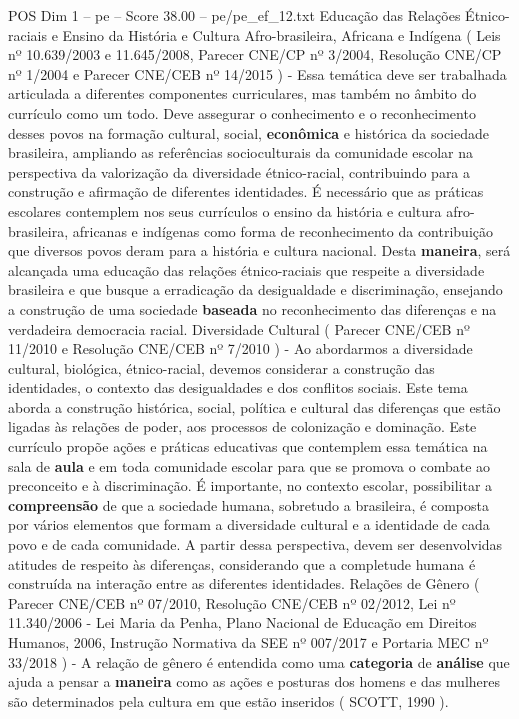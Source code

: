 \begin{textsample}{POS Dim 1 – pe – Score 38.00 – pe/pe\_ef\_12.txt}
Educação das Relações Étnico-raciais e Ensino da História e Cultura Afro-brasileira, Africana e Indígena ( Leis nº 10.639/2003 e 11.645/2008, Parecer CNE/CP nº 3/2004, Resolução CNE/CP nº 1/2004 e Parecer CNE/CEB nº 14/2015 ) - Essa temática deve ser trabalhada articulada a diferentes componentes curriculares, mas também no âmbito do currículo como um todo.
Deve assegurar o conhecimento e o reconhecimento desses povos na formação cultural, social, \textbf{econômica} e histórica da sociedade brasileira, ampliando as referências socioculturais da comunidade escolar na perspectiva da valorização da diversidade étnico-racial, contribuindo para a construção e afirmação de diferentes identidades.
É necessário que as práticas escolares contemplem nos seus currículos o ensino da história e cultura afro-brasileira, africanas e indígenas como forma de reconhecimento da contribuição que diversos povos deram para a história e cultura nacional.
Desta \textbf{maneira}, será alcançada uma educação das relações étnico-raciais que respeite a diversidade brasileira e que busque a erradicação da desigualdade e discriminação, ensejando a construção de uma sociedade \textbf{baseada} no reconhecimento das diferenças e na verdadeira democracia racial.
Diversidade Cultural ( Parecer CNE/CEB nº 11/2010 e Resolução CNE/CEB nº 7/2010 ) - Ao abordarmos a diversidade cultural, biológica, étnico-racial, devemos considerar a construção das identidades, o contexto das desigualdades e dos conflitos sociais.
Este tema aborda a construção histórica, social, política e cultural das diferenças que estão ligadas às relações de poder, aos processos de colonização e dominação.
Este currículo propõe ações e práticas educativas que contemplem essa temática na sala de \textbf{aula} e em toda comunidade escolar para que se promova o combate ao preconceito e à discriminação.
É importante, no contexto escolar, possibilitar a \textbf{compreensão} de que a sociedade humana, sobretudo a brasileira, é composta por vários elementos que formam a diversidade cultural e a identidade de cada povo e de cada comunidade.
A partir dessa perspectiva, devem ser desenvolvidas atitudes de respeito às diferenças, considerando que a completude humana é construída na interação entre as diferentes identidades.
Relações de Gênero ( Parecer CNE/CEB nº 07/2010, Resolução CNE/CEB nº 02/2012, Lei nº 11.340/2006 - Lei Maria da Penha, Plano Nacional de Educação em Direitos Humanos, 2006, Instrução Normativa da SEE nº 007/2017 e Portaria MEC nº 33/2018 ) - A relação de gênero é entendida como uma \textbf{categoria} de \textbf{análise} que ajuda a pensar a \textbf{maneira} como as ações e posturas dos homens e das mulheres são determinados pela cultura em que estão inseridos ( SCOTT, 1990 ).

\end{textsample}
